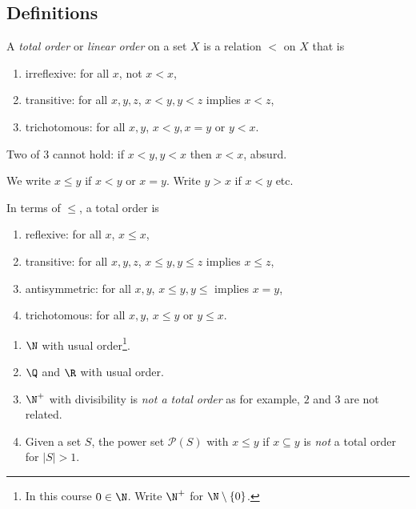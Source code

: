\documentclass[a4paper]{article}
\begin{document}
\subsection{Definitions}

\begin{definition}
  A \emph{total order} or \emph{linear order} on a set \(X\) is a relation \(<\) on \(X\) that is
  \begin{enumerate}
  \item irreflexive: for all \(x\), not \(x < x\),
  \item transitive: for all \(x, y, z\), \(x < y, y < z\) implies \(x < z\),
  \item trichotomous: for all  \(x, y\), \(x < y, x = y\) or \(y < x\).
  \end{enumerate}
\end{definition}

\begin{note}
  Two of 3 cannot hold: if \(x < y, y < x\) then \(x < x\), absurd.
\end{note}

\begin{notation}
  We write \(x \leq y\) if \(x < y\) or \(x = y\). Write \(y > x\) if \(x < y\) etc.

  In terms of \(\leq\), a total order is
  \begin{enumerate}
  \item reflexive: for all \(x\), \(x \leq x\),
  \item transitive: for all \(x, y, z\), \(x \leq y, y \leq z\) implies \(x \leq z\),
  \item antisymmetric: for all \(x, y\), \(x \leq y, y \leq\) implies \(x = y\),
  \item trichotomous: for all \(x, y\), \(x \leq y\) or \(y \leq x\).
  \end{enumerate}
\end{notation}

\begin{eg}\leavevmode
  \begin{enumerate}
  \item \(\N\) with usual order\footnote{In this course \(0 \in \N\). Write \(\N^+\) for \(\N \setminus \{0\}\).}.
  \item \(\Q\) and \(\R\) with usual order.
  \item \(\N^+\) with divisibility is \emph{not a total order} as for example, \(2\) and \(3\) are not related.
  \item Given a set \(S\), the power set \(\mathcal P(S)\) with \(x \leq y\) if \(x \subseteq y\) is \emph{not} a total order for \(|S| > 1\).
  \end{enumerate}
\end{eg}
\end{document}
